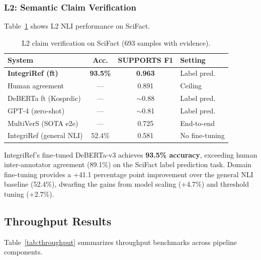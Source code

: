 \documentclass[sigconf,nonacm]{acmart}
\begin{document}
\subsubsection{L2: Semantic Claim Verification}

Table~\ref{tab:l2_results} shows L2 NLI performance on SciFact.

\begin{table}[t]
\caption{L2 claim verification on SciFact (693 samples with evidence).}
\label{tab:l2_results}
\centering
\small
\begin{tabular}{lccl}
\toprule
\textbf{System} & \textbf{Acc.} & \textbf{SUPPORTS F1} & \textbf{Setting} \\
\midrule
\textbf{IntegriRef (ft)} & \textbf{93.5\%} & \textbf{0.963} & Label pred. \\
Human agreement           & ---    & 0.891 & Ceiling \\
DeBERTa ft (Kosprdic)    & ---    & $\sim$0.88 & Label pred. \\
GPT-4 (zero-shot)        & ---    & $\sim$0.81 & Label pred. \\
MultiVerS (SOTA e2e)     & ---    & 0.725 & End-to-end \\
IntegriRef (general NLI) & 52.4\% & 0.581 & No fine-tuning \\
\bottomrule
\end{tabular}
\end{table}

IntegriRef's fine-tuned DeBERTa-v3 achieves \textbf{93.5\% accuracy}, exceeding human inter-annotator agreement (89.1\%) on the SciFact label prediction task.
Domain fine-tuning provides a +41.1 percentage point improvement over the general NLI baseline (52.4\%), dwarfing the gains from model scaling (+4.7\%) and threshold tuning (+2.7\%).

\subsection{Throughput Results}

Table~\ref{tab:throughput} summarizes throughput benchmarks across pipeline components.
\end{document}
